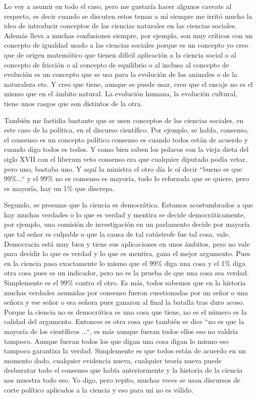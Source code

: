 Lo voy a asumir en todo el caso, pero me gustaría hacer algunos caveats al respecto, es decir cuando se discuten estos temas a mí siempre me irritó mucho la idea de introducir conceptos de las ciencias naturales en las ciencias sociales. Además lleva a muchas confusiones siempre, por ejemplo, son muy críticos con un concepto de igualdad usado a las ciencias sociales porque es un concepto yo creo que de origen matemático que tienen difícil aplicación a la ciencia social o al concepto de fricción o al concepto de equilibrio o al incluso al concepto de evolución es un concepto que se usa para la evolución de los animales o de la naturaleza etc. Y creo que tiene, aunque se puede usar, creo que el encaje no es el mismo que en el ámbito natural. La evolución humana, la evolución cultural, tiene unos rasgos que son distintos de la otra.

También me fastidia bastante que se usen conceptos de las ciencias sociales, en este caso de la política, en el discurso científico. Por ejemplo, se habla, consenso, el consenso es un concepto político consenso es cuando todos están de acuerdo y cuando digo todos es todos. Y como bien saben los polacos con la vieja dieta del siglo XVII con el liberum veto consenso era que cualquier diputado podía vetar, pero uno, bastaba uno. Y aquí la ministra el otro día le oí decir ``bueno es que 99\%...`` y el 99\% no es consenso es mayoría, todo lo reforzada que se quiere, pero es mayoría, hay un 1\% que discrepa.

Segundo, se presume que la ciencia es democrática. Estamos acostumbrados a que hay muchas verdades o lo que es verdad y mentira se decide democráticamente, por ejemplo, una comisión de investigación en un parlamento decide por mayoría que tal señor es culpable o que la causa de tal catástrofe fue tal cosa, vale. Democracia está muy bien y tiene sus aplicaciones en unos ámbitos, pero no vale para decidir lo que es verdad y lo que es mentira, gana el mejor argumento. Pues en la ciencia pasa exactamente lo mismo que el 99\% diga una cosa y el 1\% diga otra cosa pues es un indicador, pero no es la prueba de que una cosa sea verdad. Simplemente es el 99\% contra el otro. Es más, todos sabemos que en la historia muchas verdades asumidas por consenso fueron cuestionadas por un señor o una señora y ese señor o esa señora pues ganaron al final la batalla tras duro acoso. Porque la ciencia no es democrática es una cosa que tiene, no es el número es la calidad del argumento. Entonces es otra cosa que también se dice ``no es que la mayoría de los científicos ...``, es más aunque fueran todos ellos eso no valdría tampoco. Aunque fueran todos los que digan una cosa digan lo mismo eso tampoco garantiza la verdad. Simplemente es que todos están de acuerdo en un momento dado, cualquier evidencia nueva, cualquier teoría nueva puede desbaratar todo el consenso que había anteriormente y la historia de la ciencia nos muestra todo eso. Yo digo, pero repito, muchas veces se usan discursos de corte político aplicados a la ciencia y eso para mí no es válido.

